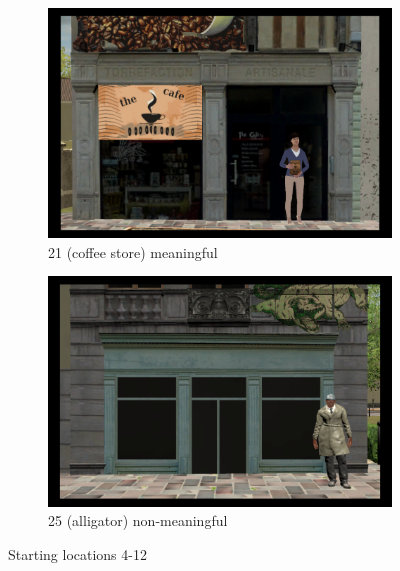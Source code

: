 \begin{figure}[!htb]
	\begin{subfigure}[b]{0.48\linewidth}
		\includegraphics[width=\linewidth]{figures/starting_locations_appx/21_S(coffee store)_A.PNG}
		\caption{21 (coffee store) meaningful}
		\label{fig:21_S(coffee store)_A}
	\end{subfigure}
	\begin{subfigure}[b]{0.48\linewidth}
		\includegraphics[width=\linewidth]{figures/starting_locations_appx/25_R(alogator)_A.PNG}
		\caption{25 (alligator) non-meaningful}
		\label{fig:25_R(alogator)_A}
	\end{subfigure}
	
	\caption[Starting locations 4-12]{Starting locations 4-12}
	\label{fig:starting_locations_4-12}
\end{figure}

